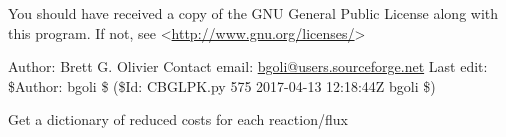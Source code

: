 \documentclass[a4paper,11pt,english]{sphinxmanual}
\begin{document}
You should have received a copy of the GNU General Public License
along with this program.  If not, see \textless{}\url{http://www.gnu.org/licenses/}\textgreater{}

Author: Brett G. Olivier
Contact email: \href{mailto:bgoli@users.sourceforge.net}{bgoli@users.sourceforge.net}
Last edit: \$Author: bgoli \$ (\$Id: CBGLPK.py 575 2017-04-13 12:18:44Z bgoli \$)

\begin{fulllineitems}
\label{modules_doc:cbmpy.CBGLPK.getReducedCosts}
Get a dictionary of reduced costs for each reaction/flux

\end{fulllineitems}

\end{document}
